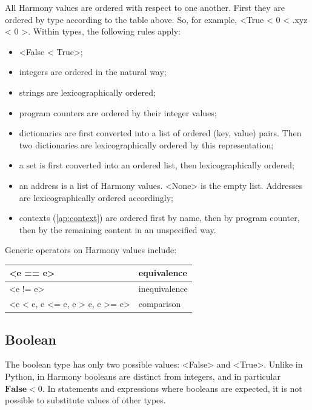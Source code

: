 \documentclass{report}
\begin{document}
All Harmony values are ordered with respect to one another.  First they
are ordered by type according to the table above.
So, for example, <{True < 0 < .xyz < { 0 }}>.
Within types, the following rules apply:

\begin{itemize}
\item <{False < True}>;
\item integers are ordered in the natural way;
\item strings are lexicographically ordered;
\item program counters are ordered by their integer values;
\item dictionaries are first converted into a list of ordered (key, value)
pairs.  Then two dictionaries are lexicographically ordered by this
representation;
\item a set is first converted into an ordered list, then lexicographically
ordered;
\item an address is a list of Harmony values.  <{None}> is the empty list.
Addresses are lexicographically ordered accordingly;
\item contexts (\autoref{ap:context}) are ordered first by name, then by program counter, then by the remaining content in an unspecified way.
\end{itemize}

Generic operators on Harmony values include:

\begin{center}
\begin{tabular}{|l|l|}
\hline
<{e == e}> & equivalence \\
\hline
<{e != e}> & inequivalence \\
\hline
<{e < e, e <= e, e > e, e >= e}> & comparison\\
\hline
\end{tabular}
\end{center}

\subsection*{Boolean}

The boolean type has only two possible values: <{False}> and
<{True}>.  Unlike in Python, in Harmony booleans are distinct
from integers, and in particular $\mathbf{False} < 0$.  In statements
and expressions where booleans are expected, it is not possible to
substitute values of other types.
\end{document}
